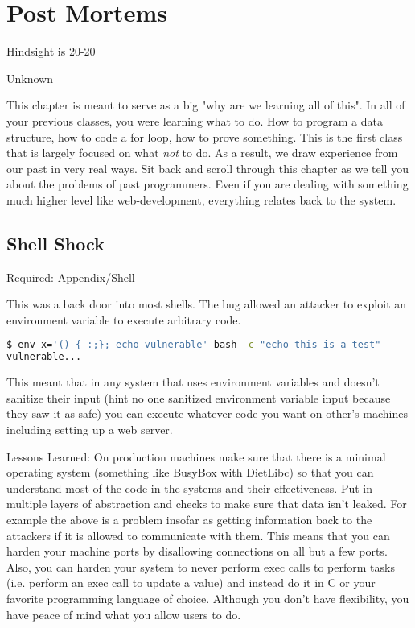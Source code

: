 \chapter{Post Mortems}

\epigraph{Hindsight is 20-20}{Unknown}

This chapter is meant to serve as a big "why are we learning all of this".
In all of your previous classes, you were learning what to do.
How to program a data structure, how to code a for loop, how to prove something.
This is the first class that is largely focused on what \textit{not} to do.
As a result, we draw experience from our past in very real ways.
Sit back and scroll through this chapter as we tell you about the problems of past programmers.
Even if you are dealing with something much higher level like web-development, everything relates back to the system.

\section{Shell Shock}

Required: Appendix/Shell

This was a back door into most shells.
The bug allowed an attacker to exploit an environment variable to execute arbitrary code.

\begin{lstlisting}[language=bash]
$ env x='() { :;}; echo vulnerable' bash -c "echo this is a test"
vulnerable...
\end{lstlisting}

This meant that in any system that uses environment variables and doesn't sanitize their input (hint no one sanitized environment variable input because they saw it as safe) you can execute whatever code you want on other's machines including setting up a web server.

Lessons Learned: On production machines make sure that there is a minimal operating system (something like BusyBox with DietLibc) so that you can understand most of the code in the systems and their effectiveness.
Put in multiple layers of abstraction and checks to make sure that data isn't leaked.
For example the above is a problem insofar as getting information back to the attackers if it is allowed to communicate with them.
This means that you can harden your machine ports by disallowing connections on all but a few ports.
Also, you can harden your system to never perform exec calls to perform tasks (i.e. perform an exec call to update a value) and instead do it in C or your favorite programming language of choice.
Although you don't have flexibility, you have peace of mind what you allow users to do.

